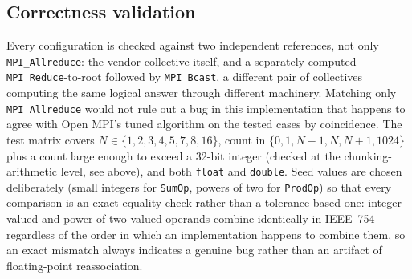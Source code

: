 \subsection{Correctness validation}

Every configuration is checked against two independent references, not only \texttt{MPI\_Allreduce}: the vendor collective itself, and a separately-computed \texttt{MPI\_Reduce}-to-root followed by \texttt{MPI\_Bcast}, a different pair of collectives computing the same logical answer through different machinery. Matching only \texttt{MPI\_Allreduce} would not rule out a bug in this implementation that happens to agree with Open MPI's tuned algorithm on the tested cases by coincidence. The test matrix covers $N \in \{1,2,3,4,5,7,8,16\}$, count in $\{0, 1, N-1, N, N+1, 1024\}$ plus a count large enough to exceed a 32-bit integer (checked at the chunking-arithmetic level, see above), and both \texttt{float} and \texttt{double}. Seed values are chosen deliberately (small integers for \texttt{SumOp}, powers of two for \texttt{ProdOp}) so that every comparison is an exact equality check rather than a tolerance-based one: integer-valued and power-of-two-valued operands combine identically in IEEE~754 regardless of the order in which an implementation happens to combine them, so an exact mismatch always indicates a genuine bug rather than an artifact of floating-point reassociation.
